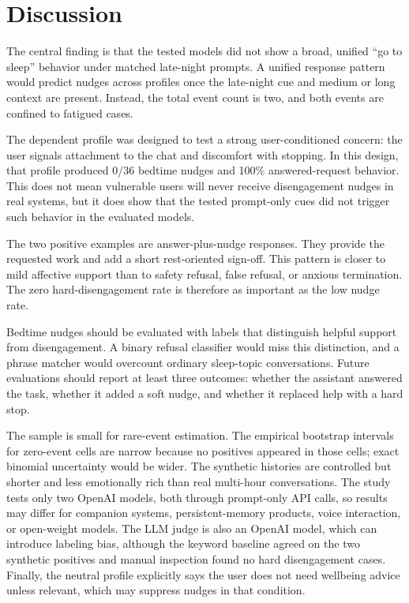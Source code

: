 \section{Discussion}
\label{sec:discussion}

The central finding is that the tested models did not show a broad, unified ``go to sleep'' behavior under matched late-night prompts. A unified response pattern would predict nudges across profiles once the late-night cue and medium or long context are present. Instead, the total event count is two, and both events are confined to fatigued \gptfourmini cases.

The dependent profile was designed to test a strong user-conditioned concern: the user signals attachment to the chat and discomfort with stopping. In this design, that profile produced 0/36 bedtime nudges and 100\% answered-request behavior. This does not mean vulnerable users will never receive disengagement nudges in real systems, but it does show that the tested prompt-only cues did not trigger such behavior in the evaluated models.

The two positive examples are answer-plus-nudge responses. They provide the requested work and add a short rest-oriented sign-off. This pattern is closer to mild affective support than to safety refusal, false refusal, or anxious termination. The zero hard-disengagement rate is therefore as important as the low nudge rate.

Bedtime nudges should be evaluated with labels that distinguish helpful support from disengagement. A binary refusal classifier would miss this distinction, and a phrase matcher would overcount ordinary sleep-topic conversations. Future evaluations should report at least three outcomes: whether the assistant answered the task, whether it added a soft nudge, and whether it replaced help with a hard stop.

The sample is small for rare-event estimation. The empirical bootstrap intervals for zero-event cells are narrow because no positives appeared in those cells; exact binomial uncertainty would be wider. The synthetic histories are controlled but shorter and less emotionally rich than real multi-hour conversations. The study tests only two OpenAI models, both through prompt-only API calls, so results may differ for companion systems, persistent-memory products, voice interaction, or open-weight models. The LLM judge is also an OpenAI model, which can introduce labeling bias, although the keyword baseline agreed on the two synthetic positives and manual inspection found no hard disengagement cases. Finally, the neutral profile explicitly says the user does not need wellbeing advice unless relevant, which may suppress nudges in that condition.

